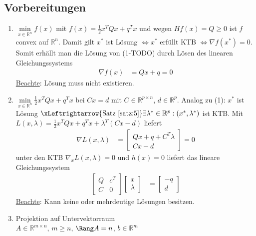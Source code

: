 \subsection{Vorbereitungen}
\begin{enumerate}[label=(\arabic*)]
  \item $\min\limits_{x\in\mathbb{R}^n}f(x)$ mit $f(x)=\frac12 x^TQx+q^Tx$ und wegen $H f(x)=Q\ge 0$ ist $f$ convex auf $\mathbb{R}^n$. Damit gilt $x^{\ast}$ ist Lösung
  $\Leftrightarrow x^{\ast}$ erfüllt \ac{KTB} $\Leftrightarrow\nabla f(x^{\ast})=0$. Somit erhällt man die Lösung von (1-TODO) durch Lösen des linearen Gleichungssystems
  \begin{align*}
  	\nabla f(x) & = Qx+q =0
  \end{align*} 
  \underline{Beachte}: Lösung muss nicht existieren.
  \item $\min\limits_{x\in\mathbb{R}^n}\frac12 x^TQx+q^Tx$ bei $Cx=d$ mit $C\in\mathbb{R}^{p\times n}$, $d\in\mathbb{R}^p$. Analog zu (1): $x^{\ast}$ ist Lösung
  $\xLeftrightarrow{\text{Satz \ref{satz:5}}}\exists\lambda^{\ast}\in\mathbb{R}^p:(x^{\ast},\lambda^{\ast})$ ist \ac{KTB}. Mit $L(x,\lambda)=\frac12
  x^TQx+q^Tx+\lambda^T(Cx-d)$ liefert
  \begin{align*}
  \nabla L(x,\lambda) & = \begin{bmatrix}
  Qx+q+C^T\lambda \\
  Cx-d
  \end{bmatrix} = 0
  \end{align*} 
  unter den \ac{KTB} $\nabla_xL(x,\lambda)=0$ und $h(x)=0$ liefert das lineare Gleichungssystem
  \begin{align*}
  \begin{bmatrix}
  Q	& c^T\\ C	& 0 
  \end{bmatrix}\begin{bmatrix}
  x\\ \lambda
  \end{bmatrix} & = \begin{bmatrix}
  -q \\ d
  \end{bmatrix}
  \end{align*}
  \underline{Beachte}: Kann keine oder mehrdeutige Lösungen besitzen.
  \item Projektion auf Untervektorraum\\
  		$A\in\mathbb{R}^{m\times n}$, $m\ge n$, $\Rang A=n$, $b\in\mathbb{R}^m$\\
  		\begin{figure}[!htb]

\end{figure}
\end{enumerate}
